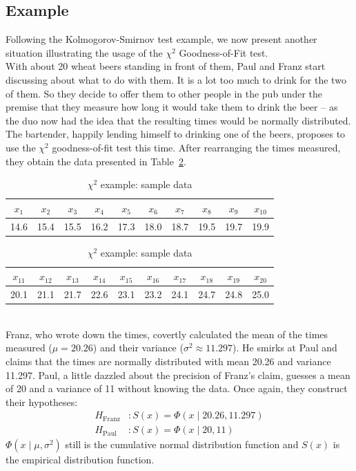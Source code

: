 \documentclass{article}
\theoremstyle{definition}
\newcommand{\reftbl}[1]{Table~\ref{#1}}
\begin{document}
\subsection{Example}
Following the Kolmogorov-Smirnov test example, we now present another situation illustrating the usage of the $\chi^2$ Goodness-of-Fit test.
\\
With about 20 wheat beers standing in front of them, Paul and Franz start discussing about what to do with them.
It is a lot too much to drink for the two of them.
So they decide to offer them to other people in the pub under the premise that they measure how long it would take them to drink the beer -- as the duo now had the idea that the resulting times would be normally distributed.
The bartender, happily lending himself to drinking one of the beers, proposes to use the $\chi^2$ goodness-of-fit test this time.
After rearranging the times measured, they obtain the data presented in \reftbl{tbl:chisqrawdata}.
%
\begin{table}[htb]
\caption{$\chi^2$ example: sample data}
\label{tbl:chisqrawdata}
\center
\begin{tabular}{cccccccccc}
$x_1$	&$x_2$	&$x_3$	&$x_4$	&$x_5$	&$x_6$	&$x_7$	&$x_8$	&$x_9$	&$x_{10}$\\
\hline
14.6	&15.4	&15.5	&16.2	&17.3	&18.0	&18.7	&19.5	&19.7	&19.9	\\
\end{tabular}
\begin{tabular}{cccccccccc}
$x_{11}$	&$x_{12}$	&$x_{13}$	&$x_{14}$	&$x_{15}$	&$x_{16}$	&$x_{17}$	&$x_{18}$	&$x_{19}$	&$x_{20}$\\
\hline
20.1	&21.1	&21.7	&22.6	&23.1	&23.2	&24.1	&24.7	&24.8	&25.0	\\
\end{tabular}
\end{table}
\\
Franz, who wrote down the times, covertly calculated the mean of the times measured ($\mu = 20.26$) and their variance ($\sigma^2 \approx 11.297$).
He smirks at Paul and claims that the times are normally distributed with mean 20.26 and variance 11.297.
Paul, a little dazzled about the precision of Franz's claim, guesses a mean of 20 and a variance of 11 without knowing the data.
Once again, they construct their hypotheses:
\begin{align*}
	H_{\text{Franz}} &: S(x) = \Phi(x\mid 20.26, 11.297)
	\\
	H_{\text{Paul}} &: S(x) = \Phi(x\mid 20, 11)
\end{align*}
$\Phi(x\mid\mu,\sigma^2)$ still is the cumulative normal distribution function and $S(x)$ is the empirical distribution function.
\end{document}

